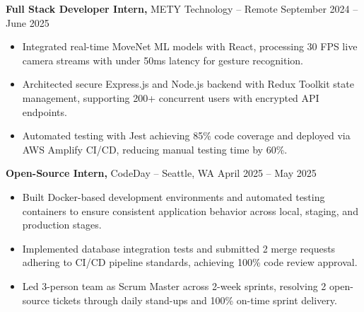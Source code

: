 \documentclass[11pt]{article}       %
\begin{document}
\textbf{Full Stack Developer Intern,} {METY Technology} -- Remote \hfill September 2024 -- June 2025 
\vspace{-9pt}
\begin{itemize}
  \item Integrated real-time MoveNet ML models with React, processing 30 FPS live camera streams with under 50ms latency for gesture recognition.
  \item Architected secure Express.js and Node.js backend with Redux Toolkit state management, supporting 200+ concurrent users with encrypted API endpoints.
  \item Automated testing with Jest achieving 85\% code coverage and deployed via AWS Amplify CI/CD, reducing manual testing time by 60\%.
\end{itemize}

\textbf{Open-Source Intern,} {CodeDay} -- Seattle, WA \hfill April 2025 -- May 2025 \\
\vspace{-9pt}
\begin{itemize}
  \item Built Docker-based development environments and automated testing containers to ensure consistent application behavior across local, staging, and production stages.
  \item Implemented database integration tests and submitted 2 merge requests adhering to CI/CD pipeline standards, achieving 100\% code review approval.
  \item Led 3-person team as Scrum Master across 2-week sprints, resolving 2 open-source tickets through daily stand-ups and 100\% on-time sprint delivery.
\end{itemize}

\end{document}

